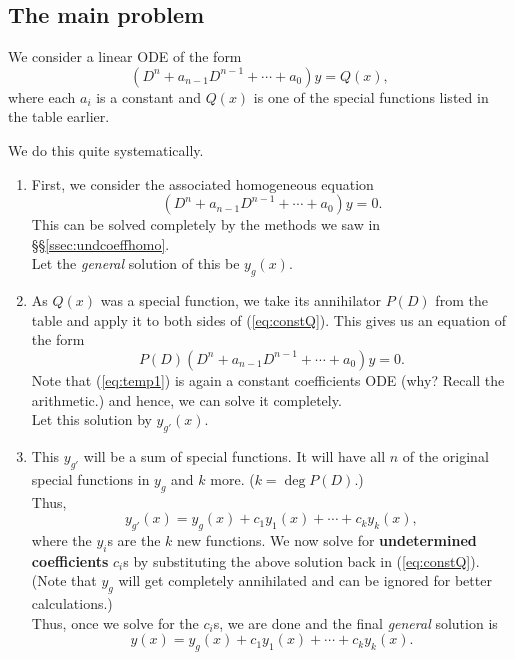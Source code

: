 \newpage

\subsection{The main problem}
\begin{mdframed}[style=boxstyle, frametitle={The Setup}]
	We consider a linear ODE of the form
	\begin{equation} \label{eq:constQ}
		(D^n + a_{n-1}D^{n-1} + \cdots + a_0)y = Q(x),
	\end{equation}
	where each $a_i$ is a constant and $Q(x)$ is one of the special functions listed in the table earlier.
\end{mdframed}
\begin{mdframed}[style=boxstyle, frametitle={The Solution}]
	We do this quite systematically.
	\begin{enumerate}[leftmargin=*, label = \Roman*.]
		\item First, we consider the associated homogeneous equation
		\begin{equation*} 
			(D^n + a_{n-1}D^{n-1} + \cdots + a_0)y = 0.
		\end{equation*}
		This can be solved completely by the methods we saw in \S\S\ref{ssec:undcoeffhomo}.\\
		Let the \emph{general} solution of this be $y_g(x).$
		\item As $Q(x)$ was a special function, we take its annihilator $P(D)$ from the table and apply it to both sides of (\ref{eq:constQ}). This gives us an equation of the form
		\begin{equation} \label{eq:temp1}
			P(D)(D^n + a_{n-1}D^{n-1} + \cdots + a_0)y = 0.
		\end{equation}
		Note that (\ref{eq:temp1}) is again a constant coefficients ODE (why? Recall the arithmetic.) and hence, we can solve it completely.\\
		Let this solution by $y_{g'}(x).$
		\item This $y_{g'}$ will be a sum of special functions. It will have all $n$ of the original special functions in $y_g$ and $k$ more. ($k = \deg P(D).$)\\
		Thus,
		\[y_{g'}(x) = y_g(x) + c_1y_1(x) + \cdots + c_ky_k(x),\]
		where the $y_i$s are the $k$ new functions. We now solve for \textbf{undetermined coefficients} $c_i$s by substituting the above solution back in (\ref{eq:constQ}). (Note that $y_g$ will get completely annihilated and can be ignored for better calculations.)\\
		Thus, once we solve for the $c_i$s, we are done and the final \emph{general} solution is
		\[y(x) = y_g(x) + c_1y_1(x) + \cdots + c_ky_k(x).\]
	\end{enumerate}
\end{mdframed}
